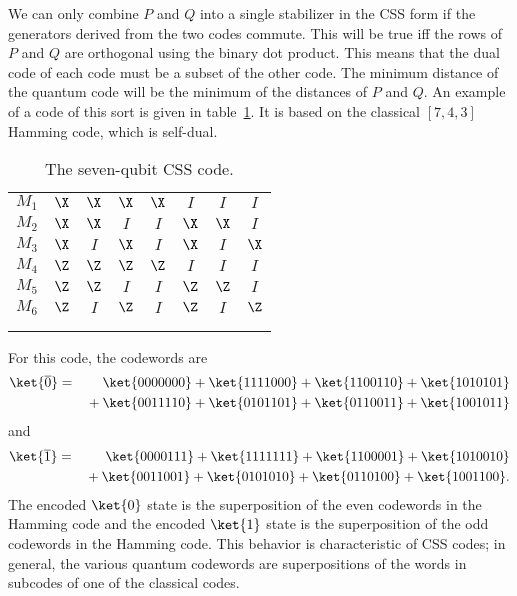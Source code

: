 We can only combine $P$ and $Q$ into a single stabilizer in the CSS form if
the generators derived from the two codes commute.  This will be true iff the
rows of $P$ and $Q$ are orthogonal using the binary dot product.  This
means that the dual code of each code must be a subset of the other code.
The minimum distance of the quantum code will be the minimum of the
distances of $P$ and $Q$.  An example of a code of this sort is given in
table~\ref{table-7qubit}.  It is based on the classical $[7,4,3]$ Hamming
code, which is self-dual.
\begin{table}
	\centering
	\begin{tabular}{c|ccccccc}
		$M_1$ & $\X$ & $\X$ & $\X$ & $\X$ & $I$ & $I$ & $I$ \\
		$M_2$ & $\X$ & $\X$ & $I$ & $I$ & $\X$ & $\X$ & $I$ \\
		$M_3$ & $\X$ & $I$ & $\X$ & $I$ & $\X$ & $I$ & $\X$ \\
		$M_4$ & $\Z$ & $\Z$ & $\Z$ & $\Z$ & $I$ & $I$ & $I$ \\
		$M_5$ & $\Z$ & $\Z$ & $I$ & $I$ & $\Z$ & $\Z$ & $I$ \\
		$M_6$ & $\Z$ & $I$ & $\Z$ & $I$ & $\Z$ & $I$ & $\Z$ \\
		\hline
		\low{$\Xbar$} & \low{$I$} & \low{$I$} & \low{$I$} & \low{$I$} & \low{$\X$} &
		\low{$\X$} & \low{$\X$} \\
		\low{$\Zbar$} & \low{$I$} & \low{$I$} & \low{$I$} & \low{$I$} & \low{$\Z$} &
		\low{$\Z$} & \low{$\Z$}
	\end{tabular}
	\caption{The seven-qubit CSS code.}
	\label{table-7qubit}
\end{table}
For this code, the codewords are
\begin{eqnarray}
	\ket{\overline{0}} & = & \ket{0000000} + \ket{1111000} + \ket{1100110} +
	\ket{1010101} \nonumber \\
	& & \mbox{} + \ket{0011110} + \ket{0101101} + \ket{0110011} + \ket{1001011}
\end{eqnarray}
and
\begin{eqnarray}
	\ket{\overline{1}} & = & \ket{0000111} + \ket{1111111} + \ket{1100001} +
	\ket{1010010} \nonumber \\
	& & \mbox{} + \ket{0011001} + \ket{0101010} + \ket{0110100} + \ket{1001100}.
\end{eqnarray}
The encoded $\ket{0}$ state is the superposition of the even codewords in
the Hamming code and the encoded $\ket{1}$ state is the superposition of
the odd codewords in the Hamming code.  This behavior is characteristic
of CSS codes; in general, the various quantum codewords are superpositions
of the words in subcodes of one of the classical codes.

